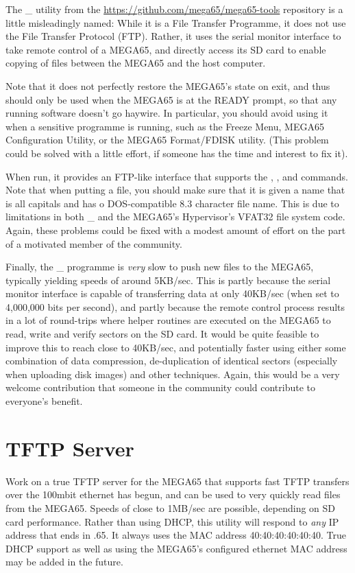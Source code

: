 The \_ utility from
the \url{https://github.com/mega65/mega65-tools} repository is a
little misleadingly named: While it 
is a File Transfer Programme, it does not use the File Transfer
Protocol (FTP).  Rather, it uses the serial monitor interface to take
remote control of a MEGA65, and directly access its SD card to enable
copying of files between the MEGA65 and the host computer.

Note that it does not perfectly restore the MEGA65's state on exit,
and thus should only be used when the MEGA65 is at the READY prompt,
so that any running software doesn't go haywire. In particular, you
should avoid using it when a sensitive programme is running, such as
the Freeze Menu, MEGA65 Configuration Utility, or the MEGA65
Format/FDISK utility.  (This problem could be solved with a little
effort, if someone has the time and interest to fix it).

When run, it provides an FTP-like interface that supports
the , ,  and  commands.
Note that when putting a file, you should make sure that it is given a
name that is all capitals and has o DOS-compatible 8.3 character file
name.  This is due to limitations in both \_ and the
MEGA65's Hypervisor's VFAT32 file system code. Again, these problems
could be fixed with a modest amount of effort on the part of a
motivated member of the community.

Finally, the \_ programme is {\em very} slow to push
new files to the MEGA65, typically yielding speeds of around 5KB/sec.
This is partly because the serial monitor interface is capable of
transferring data at only 40KB/sec (when set to 4,000,000 bits per
second), and partly because the remote control process results in a
lot of round-trips where helper routines are executed on the MEGA65 to
read, write and verify sectors on the SD card.  It would be quite
feasible to improve this to reach close to 40KB/sec, and potentially
faster using either some combination of data compression,
de-duplication of identical sectors (especially when uploading disk
images) and other techniques. Again, this would be a very welcome
contribution that someone in the community could contribute to
everyone's benefit.

\section{TFTP Server}

Work on a true TFTP server for the MEGA65 that supports fast
TFTP transfers over the 100mbit ethernet has begun, and can be used to
very quickly read files from the MEGA65. Speeds of close to 1MB/sec
are possible, depending on SD card performance.  Rather than using
DHCP, this utility will respond to {\em any} IP address that ends in
.65. It always uses the MAC address 40:40:40:40:40:40. True DHCP
support as well as using the MEGA65's configured ethernet MAC address
may be added in the future. 

